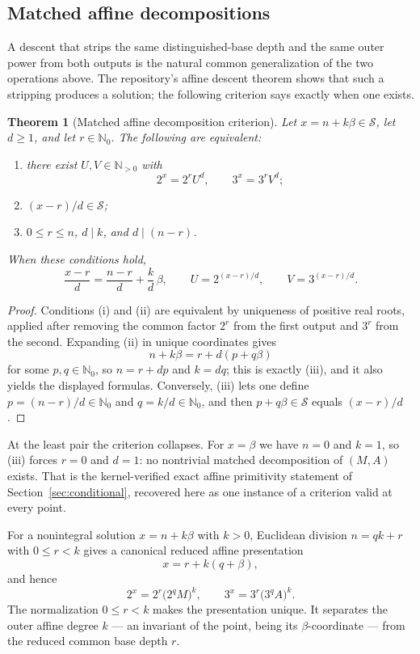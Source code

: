 \documentclass[11pt,oneside]{article}
\newtheorem{theorem}{Theorem}[section]
\theoremstyle{definition}
\theoremstyle{remark}
\newcommand{\N}{\mathbb N}
\newcommand{\Nzero}{\mathbb N_0}
\newcommand{\Sol}{\mathcal S}
\begin{document}
\subsection{Matched affine decompositions}

A descent that strips the same distinguished-base depth and the same outer power from both
outputs is the natural common generalization of the two operations above.  The repository's
affine descent theorem shows that such a stripping produces a solution; the following criterion
says exactly when one exists.

\begin{theorem}[Matched affine decomposition criterion]
\label{pp:affine-decomp}
Let $x=n+k\beta\in\Sol$, let $d\ge1$, and let $r\in\Nzero$.  The following are equivalent:
\begin{enumerate}[label=\textup{(\roman*)}]
\item there exist $U,V\in\N_{>0}$ with
\[
 2^x=2^rU^d,\qquad 3^x=3^rV^d;
\]
\item $(x-r)/d\in\Sol$;
\item $0\le r\le n$, $d\mid k$, and $d\mid(n-r)$.
\end{enumerate}
When these conditions hold,
\[
 \frac{x-r}{d}=\frac{n-r}{d}+\frac kd\,\beta,
 \qquad
 U=2^{(x-r)/d},\qquad V=3^{(x-r)/d}.
\]
\end{theorem}

\begin{proof}
Conditions (i) and (ii) are equivalent by uniqueness of positive real roots, applied after
removing the common factor $2^r$ from the first output and $3^r$ from the second.  Expanding
(ii) in unique coordinates gives
\[
 n+k\beta=r+d(p+q\beta)
\]
for some $p,q\in\Nzero$, so $n=r+dp$ and $k=dq$; this is exactly (iii), and it also yields the
displayed formulas.  Conversely, (iii) lets one define $p=(n-r)/d\in\Nzero$ and
$q=k/d\in\Nzero$, and then $p+q\beta\in\Sol$ equals $(x-r)/d$.
\end{proof}

At the least pair the criterion collapses.  For $x=\beta$ we have $n=0$ and $k=1$, so (iii)
forces $r=0$ and $d=1$: no nontrivial matched decomposition of $(M,A)$ exists.  That is the
kernel-verified exact affine primitivity statement of Section~\ref{sec:conditional}, recovered
here as one instance of a criterion valid at every point.

For a nonintegral solution $x=n+k\beta$ with $k>0$, Euclidean division $n=qk+r$ with
$0\le r<k$ gives a canonical reduced affine presentation
\begin{equation}
 x=r+k(q+\beta),
\label{pp:eq-euclidean-affine}
\end{equation}
and hence
\[
 2^x=2^r\bigl(2^qM\bigr)^k,
 \qquad
 3^x=3^r\bigl(3^qA\bigr)^k .
\]
The normalization $0\le r<k$ makes the presentation unique.  It separates the outer affine
degree $k$ --- an invariant of the point, being its $\beta$-coordinate --- from the reduced
common base depth $r$.
\end{document}

